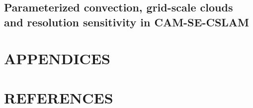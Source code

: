\documentclass[12pt]{article}
\begin{document}
\newpage
\begin{center}
\section{Parameterized convection, grid-scale clouds and resolution sensitivity in CAM-SE-CSLAM}
\end{center}


\newpage
\begin{center}
\end{center}

\newpage
\section*{APPENDICES}


\newpage
\section*{REFERENCES}
\setlength{\bibsep}{0pt}
{\normalsize
}
\end{document}
